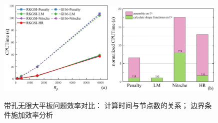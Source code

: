 \begin{figure}[H]
\centering
    \begin{subcaptiongroup}
    \includegraphics[width=0.49\textwidth]{figure/EHR/hole/cputime.png}
    \label{Hcputime}
    \includegraphics[width=0.49\textwidth]{figure/EHR/hole/efficiency.png}
    \label{Hefficiency}
\end{subcaptiongroup}
\caption{带孔无限大平板问题效率对比： 计算时间与节点数的关系； 边界条件施加效率分析}
\end{figure} 
